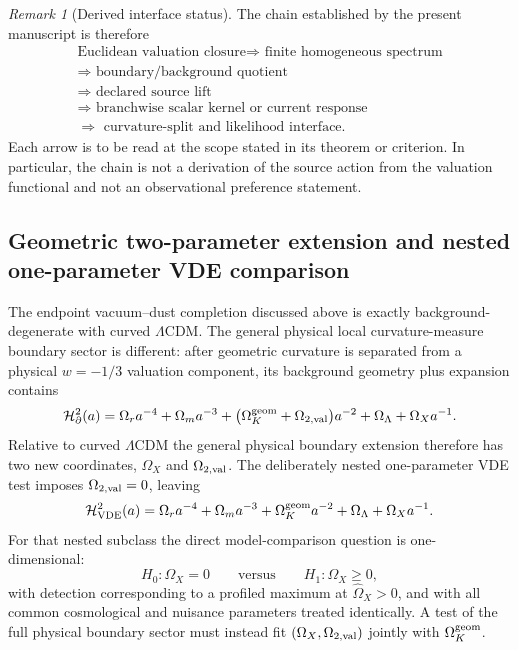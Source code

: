 \documentclass[11pt,a4paper]{article}
\numberwithin{equation}{section}
\theoremstyle{definition}
\theoremstyle{plain}
\theoremstyle{remark}
\newtheorem{remark}[criterion]{Remark}
\begin{document}
\begin{remark}[Derived interface status]
The chain established by the present manuscript is therefore
\begin{equation}
\boxed{
\begin{gathered}
\text{Euclidean valuation closure}
\Longrightarrow \text{ finite homogeneous spectrum}\\
\Longrightarrow \text{ boundary/background quotient}\\
\Longrightarrow \text{ declared source lift}\\
\Longrightarrow \text{ branchwise scalar kernel or current response}\\
\Longrightarrow \text{ curvature-split and likelihood interface}.
\end{gathered}}
\end{equation}
Each arrow is to be read at the scope stated in its theorem or criterion.  In
particular, the chain is not a derivation of the source action from the
valuation functional and not an observational preference statement.
\end{remark}

\subsection{Geometric two-parameter extension and nested one-parameter VDE comparison}
The endpoint vacuum--dust completion discussed above is exactly background-degenerate with curved \(\Lambda\)CDM. The general physical local curvature-measure boundary sector is different: after geometric curvature is separated from a physical \(w=-1/3\) valuation component, its background geometry plus expansion contains
\begin{equation}
\mathcal H^2_{\partial}(a)=
\Omega_r a^{-4}+\Omega_m a^{-3}
+\bigl(\Omega_K^{\rm geom}+\Omega_{2,\rm val}\bigr)a^{-2}
+\Omega_\Lambda+\Omega_Xa^{-1}.
\end{equation}
Relative to curved \(\Lambda\)CDM the general physical boundary extension therefore has two new coordinates, \(\Omega_X\) and \(\Omega_{2,\rm val}\). The deliberately nested one-parameter VDE test imposes \(\Omega_{2,\rm val}=0\), leaving
\begin{equation}
\mathcal H^2_{\rm VDE}(a)=
\Omega_r a^{-4}+\Omega_m a^{-3}+\Omega_K^{\rm geom}a^{-2}
+\Omega_\Lambda+\Omega_Xa^{-1}.
\end{equation}
For that nested subclass the direct model-comparison question is one-dimensional:
\begin{equation}
H_0:\Omega_X=0
\qquad\text{versus}\qquad
H_1:\Omega_X\ge0,
\end{equation}
with detection corresponding to a profiled maximum at \(\widehat\Omega_X>0\), and with all common cosmological and nuisance parameters treated identically. A test of the full physical boundary sector must instead fit \((\Omega_X,\Omega_{2,\rm val})\) jointly with \(\Omega_K^{\rm geom}\).
\end{document}
